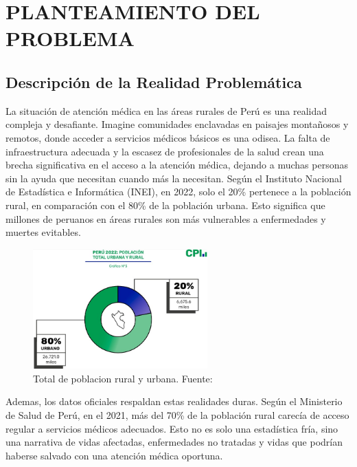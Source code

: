 \chapter{PLANTEAMIENTO DEL PROBLEMA}
\section{Descripción de la Realidad Problemática}


La situación de atención médica en las áreas rurales de Perú es una realidad compleja y desafiante. Imagine comunidades enclavadas en paisajes montañosos y remotos, donde acceder a servicios médicos básicos es una odisea. La falta de infraestructura adecuada y la escasez de profesionales de la salud crean una brecha significativa en el acceso a la atención médica, dejando a muchas personas sin la ayuda que necesitan cuando más la necesitan. Según el Instituto Nacional de Estadística e Informática (INEI), en 2022, solo el 20\% pertenece a la población rural, en comparación con el 80\% de la población urbana. Esto significa que millones de peruanos en áreas rurales son más vulnerables a enfermedades y muertes evitables.

\begin{figure}[h]
	\begin{center}
		\includegraphics[width=0.6\textwidth]{1/figures/INEITOTAL.jpeg}
		\caption{Total de poblacion rural y urbana. Fuente: \cite{gl_inei}}
		\label{1:fig}
	\end{center}
\end{figure}

Ademas, los datos oficiales respaldan estas realidades duras. Según el Ministerio de Salud de Perú, en el 2021, más del 70\% de la población rural carecía de acceso regular a servicios médicos adecuados. Esto no es solo una estadística fría, sino una narrativa de vidas afectadas, enfermedades no tratadas y vidas que podrían haberse salvado con una atención médica oportuna.

